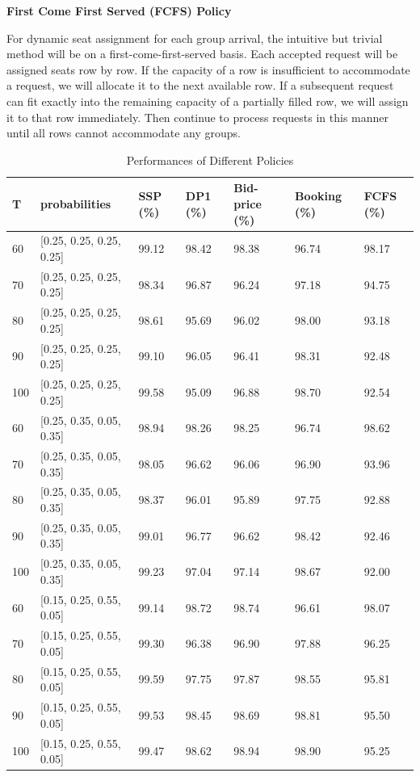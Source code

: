 {\bf{First Come First Served (FCFS) Policy}}

For dynamic seat assignment for each group arrival, the intuitive but trivial method will be on a first-come-first-served basis. Each accepted request will be assigned seats row by row. If the capacity of a row is insufficient to accommodate a request, we will allocate it to the next available row. If a subsequent request can fit exactly into the remaining capacity of a partially filled row, we will assign it to that row immediately. Then continue to process requests in this manner until all rows cannot accommodate any groups.

\begin{table}[ht]
  \centering
  \caption{Performances of Different Policies}
  \begin{tabular}{|l|l|l|l|l|l|l|}
  \hline
   T & probabilities & SSP (\%) & DP1 (\%) & Bid-price (\%) & Booking (\%) & FCFS (\%) \\
  \hline
   60  & [0.25, 0.25, 0.25, 0.25]  & 99.12 & 98.42 & 98.38 & 96.74 & 98.17 \\
   70  & [0.25, 0.25, 0.25, 0.25]  & 98.34 & 96.87 & 96.24 & 97.18 & 94.75 \\
   80  & [0.25, 0.25, 0.25, 0.25]  & 98.61 & 95.69 & 96.02 & 98.00 & 93.18 \\
   90  & [0.25, 0.25, 0.25, 0.25]  & 99.10 & 96.05 & 96.41 & 98.31 & 92.48 \\
   100 & [0.25, 0.25, 0.25, 0.25]  & 99.58 & 95.09 & 96.88 & 98.70 & 92.54 \\
   \hline
   60  & [0.25, 0.35, 0.05, 0.35]  & 98.94 & 98.26 & 98.25 & 96.74 & 98.62 \\
   70  & [0.25, 0.35, 0.05, 0.35]  & 98.05 & 96.62 & 96.06 & 96.90 & 93.96 \\
   80  & [0.25, 0.35, 0.05, 0.35]  & 98.37 & 96.01 & 95.89 & 97.75 & 92.88 \\
   90  & [0.25, 0.35, 0.05, 0.35]  & 99.01 & 96.77 & 96.62 & 98.42 & 92.46 \\
   100 & [0.25, 0.35, 0.05, 0.35]  & 99.23 & 97.04 & 97.14 & 98.67 & 92.00 \\
  \hline
  60  & [0.15, 0.25, 0.55, 0.05]  & 99.14 & 98.72 & 98.74 & 96.61 & 98.07 \\
  70  & [0.15, 0.25, 0.55, 0.05]  & 99.30 & 96.38 & 96.90 & 97.88 & 96.25 \\
  80  & [0.15, 0.25, 0.55, 0.05]  & 99.59 & 97.75 & 97.87 & 98.55 & 95.81 \\
  90  & [0.15, 0.25, 0.55, 0.05]  & 99.53 & 98.45 & 98.69 & 98.81 & 95.50 \\
  100 & [0.15, 0.25, 0.55, 0.05]  & 99.47 & 98.62 & 98.94 & 98.90 & 95.25 \\
  \hline
  \end{tabular}
\end{table}

